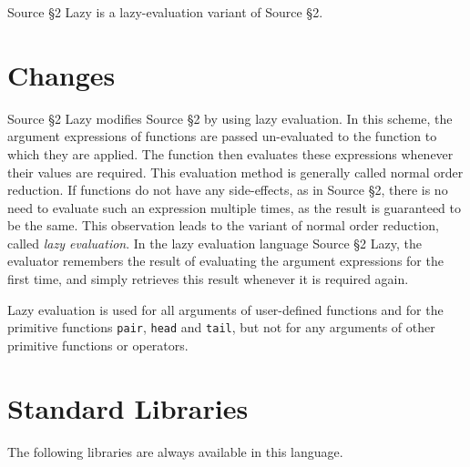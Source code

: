 





Source \S 2 Lazy is a lazy-evaluation variant of Source \S 2.

\section{Changes}

Source \S 2 Lazy modifies Source \S 2 by using
lazy evaluation. In
this scheme, the argument expressions of functions are passed un-evaluated
to the function to which they are applied. The function then evaluates
these expressions whenever their values are required. This evaluation
method is generally
called normal order reduction. If functions
do not have any side-effects, as in Source \S 2,
there is no need to evaluate such an expression
multiple times, as the result is guaranteed to be the same. This observation
leads to the variant of normal order reduction, called \emph{lazy evaluation}.
In the lazy evaluation language Source \S 2 Lazy,
the evaluator remembers the result of evaluating the
argument expressions for the first time, and simply retrieves this result
whenever it is required again.

Lazy evaluation is used for all arguments of user-defined functions and
for the primitive functions \lstinline{pair}, \lstinline{head} and
\lstinline{tail}, but
not for any arguments of other primitive functions or operators.

\newpage





















\section{Standard Libraries}

The following libraries are always available in this language.









\newpage



    
